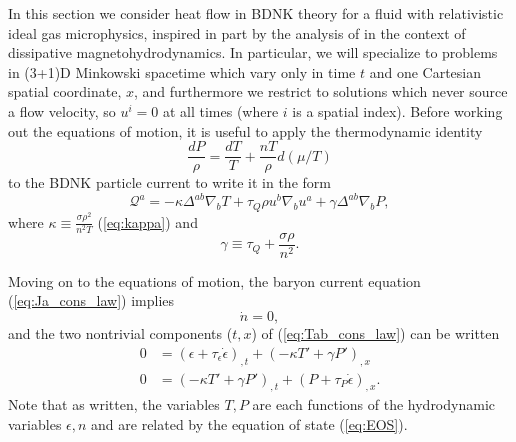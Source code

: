 \documentclass[%
notitlepage,
superscriptaddress,
nofootinbib,
amsmath,
amssymb,
aps,
twocolumn
]{revtex4-1}
\begin{document}
In this section we consider heat flow in BDNK theory for a fluid with relativistic ideal gas microphysics, inspired in part by the analysis of \cite{Most:2021rhr} in the context of dissipative magnetohydrodynamics.  In particular, we will specialize to problems in (3+1)D Minkowski spacetime which vary only in time $t$ and one Cartesian spatial coordinate, $x$, and furthermore we restrict to solutions which never source a flow velocity, so $u^{i} = 0$ at all times (where $i$ is a spatial index).  Before working out the equations of motion, it is useful to apply the thermodynamic identity
\begin{equation} \label{eq:thermo_identity}
\frac{d P}{\rho} = \frac{d T}{T} + \frac{n T}{\rho} d(\mu/T)
\end{equation}
to the BDNK particle current to write it in the form
\begin{equation} \label{eq:alt_heat_vector}
\mathcal{Q}^{a} = - \kappa \Delta^{a b} \nabla_b T + \tau_{Q} \rho u^{b} \nabla_{b} u^{a} + \gamma \Delta^{a b} \nabla_{b} P,
\end{equation}
where  $\kappa \equiv \frac{\sigma \rho^2}{n^2 T}$ (\ref{eq:kappa}) and 
\begin{equation} \label{eq:gamma}
\gamma \equiv \tau_{Q} + \frac{\sigma \rho}{n^2}.
\end{equation}

Moving on to the equations of motion, the baryon current equation (\ref{eq:Ja_cons_law}) implies
\begin{equation} \label{eq:heat_baryon_EOM}
\dot{n} = 0,
\end{equation}
and the two nontrivial components ($t, x$) of (\ref{eq:Tab_cons_law}) can be written
\begin{align}
0 &= (\epsilon + \tau_{\epsilon} \dot{\epsilon})_{,t} + (- \kappa T' + \gamma P')_{,x} \label{eq:heat_t_eqn} \\
0 &= (- \kappa T' + \gamma P')_{,t} + (P + \tau_{P} \dot{\epsilon})_{,x}. \label{eq:heat_x_eqn}
\end{align}
Note that as written, the variables $T, P$ are each functions of the hydrodynamic variables $\epsilon, n$ and are related by the equation of state (\ref{eq:EOS}).
\end{document}
